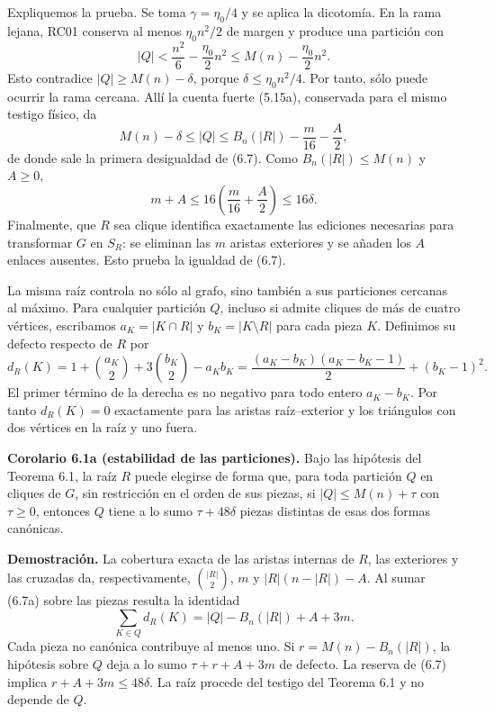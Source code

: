 \documentclass[spanish,11pt,a4paper]{article}
\begin{document}
Expliquemos la prueba. Se toma \(\gamma=\eta_0/4\) y se aplica la dicotomía. En la rama lejana, RC01 conserva al menos \(\eta_0n^2/2\) de margen y produce una partición con \[
|Q|<\frac{n^2}{6}-\frac{\eta_0}{2}n^2
\le M(n)-\frac{\eta_0}{2}n^2.
\] Esto contradice \(|Q|\ge M(n)-\delta\), porque \(\delta\le\eta_0n^2/4\). Por tanto, sólo puede ocurrir la rama cercana. Allí la cuenta fuerte (5.15a), conservada para el mismo testigo físico, da \[
M(n)-\delta\le |Q|
\le B_n(|R|)-\frac m{16}-\frac A2,
\] de donde sale la primera desigualdad de (6.7). Como \(B_n(|R|)\le M(n)\) y \(A\ge0\), \[
m+A\le16\left(\frac m{16}+\frac A2\right)\le16\delta.
\] Finalmente, que \(R\) sea clique identifica exactamente las ediciones necesarias para transformar \(G\) en \(S_R\): se eliminan las \(m\) aristas exteriores y se añaden los \(A\) enlaces ausentes. Esto prueba la igualdad de (6.7).

La misma raíz controla no sólo al grafo, sino también a sus particiones cercanas al máximo. Para cualquier partición \(Q\), incluso si admite cliques de más de cuatro vértices, escribamos \(a_K=|K\cap R|\) y \(b_K=|K\setminus R|\) para cada pieza \(K\). Definimos su defecto respecto de \(R\) por \[
d_R(K)=1+\binom{a_K}{2}+3\binom{b_K}{2}-a_Kb_K
=\frac{(a_K-b_K)(a_K-b_K-1)}2+(b_K-1)^2.
\tag{6.7a}
\] El primer término de la derecha es no negativo para todo entero \(a_K-b_K\). Por tanto \(d_R(K)=0\) exactamente para las aristas raíz--exterior y los triángulos con dos vértices en la raíz y uno fuera.


\textbf{Corolario 6.1a (estabilidad de las particiones).} Bajo las hipótesis del Teorema 6.1, la raíz \(R\) puede elegirse de forma que, para toda partición \(Q\) en cliques de \(G\), sin restricción en el orden de sus piezas, si \(|Q|\le M(n)+\tau\) con \(\tau\ge0\), entonces \(Q\) tiene a lo sumo \(\tau+48\delta\) piezas distintas de esas dos formas canónicas.

\textbf{Demostración.} La cobertura exacta de las aristas internas de \(R\), las exteriores y las cruzadas da, respectivamente, \(\binom{|R|}{2}\), \(m\) y \(|R|(n-|R|)-A\). Al sumar (6.7a) sobre las piezas resulta la identidad \[
\sum_{K\in Q}d_R(K)=|Q|-B_n(|R|)+A+3m.
\tag{6.7b}
\] Cada pieza no canónica contribuye al menos uno. Si \(r=M(n)-B_n(|R|)\), la hipótesis sobre \(Q\) deja a lo sumo \(\tau+r+A+3m\) de defecto. La reserva de (6.7) implica \(r+A+3m\le48\delta\). La raíz procede del testigo del Teorema 6.1 y no depende de \(Q\).
\end{document}
